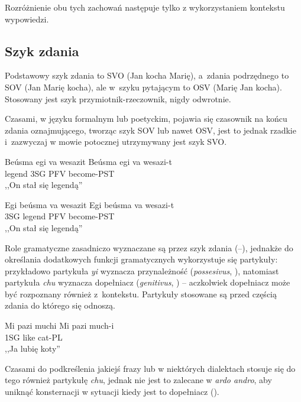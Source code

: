 \begin{spacing}{1.1}
Rozróżnienie obu tych zachowań następuje tylko z wykorzystaniem kontekstu
wypowiedzi.

\subsection{Szyk zdania}

Podstawowy szyk zdania to SVO (Jan kocha Marię), a~zdania podrzędnego to SOV
(Jan Marię kocha), ale w~szyku pytającym to OSV (Marię Jan kocha). Stosowany
jest szyk przymiotnik-rzeczownik, nigdy odwrotnie.

Czasami, w języku formalnym lub poetyckim, pojawia się czasownik na końcu zdania
oznajmującego, tworząc szyk SOV lub nawet OSV, jest to jednak rzadkie
i~zazwyczaj w mowie potocznej utrzymywany jest szyk SVO.

\begin{exe}
	\ex
	\trans Beúsma egi va wesazit
	\gll  Beúsma egi va wesazi-t \\
	  legend 3SG PFV become-PST \\
	\glt  ,,On stał się legendą''
\end{exe}

\begin{exe}
	\ex
	\trans Egi beúsma va wesazit
	\gll  Egi beúsma va wesazi-t \\
	  3SG legend PFV become-PST \\
	\glt  ,,On stał się legendą''
\end{exe}

Role gramatyczne zasadniczo wyznaczane są przez szyk zdania (\Nom{}--\Acc{}),
jednakże do określania dodatkowych funkcji gramatycznych wykorzystuje się
partykuły: przykładowo partykuła \emph{yi} wyznacza przynależność
(\emph{possesivus}, \Poss{}), natomiast partykuła \emph{chu} wyznacza
dopełniacz (\emph{genitivus}, \Gen{}) -- aczkolwiek dopełniacz może być
rozpoznany również z~kontekstu. Partykuły stosowane są przed częścią zdania do
którego się odnoszą.

\begin{exe}
	\ex
	\trans Mi pazi muchi
	\gll  Mi pazi much-i \\
	  1SG like cat-PL \\
	\glt  ,,Ja lubię koty''
\end{exe}

Czasami do podkreślenia jakiejś frazy lub w niektórych dialektach stosuje się do
tego również partykułę \emph{chu}, jednak nie jest to zalecane w \emph{ardo
andro}, aby uniknąć konsternacji w sytuacji kiedy jest to dopełniacz
(\Gen{}).


\end{spacing}
